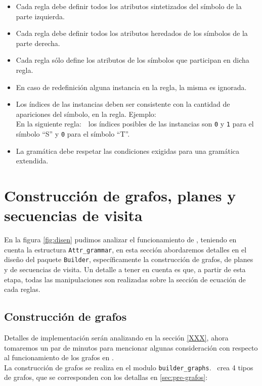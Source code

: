\begin{description}
\begin{itemize}
\item Cada regla debe definir todos los atributos sintetizados del símbolo de la parte izquierda.
\item Cada regla debe definir todos los atributos heredados de los símbolos de la parte derecha.
\item Cada regla sólo define los atributos de los símbolos que participan en dicha regla.
\item En caso de redefinición alguna instancia en la regla, la misma es ignorada.
\item Los índices de las instancias deben ser consistente con la cantidad de apariciones del símbolo, en la regla. Ejemplo: \\En la siguiente regla:\ \ los índices posibles de las instancias son \texttt{0} y \texttt{1} para el símbolo ``S'' y \texttt{0} para el símbolo ``T''.
\item La gramática debe respetar las condiciones exigidas para una gramática extendida. 
\end{itemize}
\end{description}

\section{Construcción de grafos, planes y secuencias de visita}

En la figura \ref{fig:disen} pudimos analizar el funcionamiento de \maggen, teniendo en cuenta la estructura \texttt{Attr\_grammar}, en esta sección abordaremos detalles en el diseño del paquete \texttt{Builder}, específicamente la construcción de grafos, de planes y de secuencias de visita. Un detalle a tener en cuenta es que, a partir de esta etapa, todas las manipulaciones son realizadas sobre la sección de ecuación de cada reglas.

\subsection*{Construcción de grafos}
\label{subsec:graph}

Detalles de implementación serán analizando en la sección \ref{XXX}, ahora tomaremos un par de minutos para mencionar algunas consideración con respecto al funcionamiento de los grafos en \maggen.\\

La construcción de grafos se realiza en el modulo \texttt{builder\_graphs}. \maggen\ crea 4 tipos de grafos, que se corresponden con los detallas en \ref{sec:pre-grafos}:

